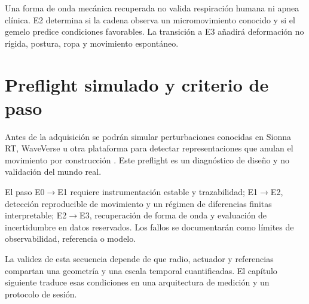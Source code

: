 Una forma de onda mecánica recuperada no valida respiración humana ni apnea clínica. E2 determina si la cadena observa un micromovimiento conocido y si el gemelo predice condiciones favorables. La transición a E3 añadirá deformación no rígida, postura, ropa y movimiento espontáneo.

\section{Preflight simulado y criterio de paso}

Antes de la adquisición se podrán simular perturbaciones conocidas en Sionna RT, WaveVerse u otra plataforma para detectar representaciones que anulan el movimiento por construcción \citep{Hoydis2023SionnaRT,Zheng2026WaveVerse}. Este preflight es un diagnóstico de diseño y no validación del mundo real.

El paso E0$\rightarrow$E1 requiere instrumentación estable y trazabilidad; E1$\rightarrow$E2, detección reproducible de movimiento y un régimen de diferencias finitas interpretable; E2$\rightarrow$E3, recuperación de forma de onda y evaluación de incertidumbre en datos reservados. Los fallos se documentarán como límites de observabilidad, referencia o modelo.

La validez de esta secuencia depende de que radio, actuador y referencias compartan
una geometría y una escala temporal cuantificadas. El capítulo siguiente traduce
esas condiciones en una arquitectura de medición y un protocolo de sesión.
